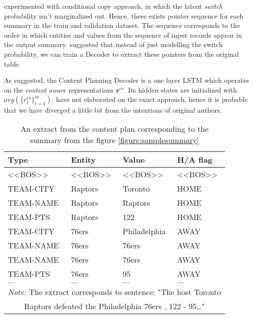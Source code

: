 \citet{wiseman2017} experimented with conditional copy approach, in which the latent \emph{switch} probability isn't marginalized out. Hence, there exists pointer sequence for each summary in the train and validation dataset. The sequence corresponds to the order in which entities and values from the sequence of input records appear in the output summary. \citet{puduppully2019datatotext} suggested that instead of just modelling the switch probability, we can train a Decoder to extract these pointers from the original table.

As suggested, the Content Planning Decoder is a one layer LSTM which operates on the \emph{context aware} representations $\boldsymbol{r}^{cs}$. Its hidden states are initialized with $avg(\{r_t^{cs}\}_{t=1}^m)$. \citet{puduppully2019datatotext} have not elaborated on the exact approach, hence it is probable that we have diverged a little bit from the intentions of original authors.

\begin{table}[h]
    \centering \small
    \begin{tabular}{llll}
        \toprule
        \textbf{Type} & \textbf{Entity} & \textbf{Value} & \textbf{H/A flag} \\                  
        \midrule
        \textless{}\textless{}BOS\textgreater{}\textgreater{} & \textless{}\textless{}BOS\textgreater{}\textgreater{} & \textless{}\textless{}BOS\textgreater{}\textgreater{} & \textless{}\textless{}BOS\textgreater{}\textgreater{} \\
        TEAM-CITY    & Raptors      & Toronto      & HOME                                                  \\
        TEAM-NAME    & Raptors      & Raptors      & HOME                                                  \\
        TEAM-PTS     & Raptors      & 122          & HOME                                                  \\
        TEAM-CITY    & 76ers        & Philadelphia & AWAY                                                  \\
        TEAM-NAME    & 76ers        & 76ers        & AWAY                                                  \\
        TEAM-NAME    & 76ers        & 76ers        & AWAY                                                  \\
        TEAM-PTS     & 76ers        & 95           & AWAY                                                  \\
        $\dots$      & $\dots$      & $\dots$      & $\dots$ \\                                        
        \bottomrule
        \multicolumn{4}{c}{\footnotesize \textit{Note:} The extract corresponds to sentence: "The host Toronto} \\
        \multicolumn{4}{c}{\footnotesize Raptors defeated the Philadelphia 76ers , 122 - 95\dots "}
    \end{tabular}
    \caption{An extract from the content plan corresponding to the summary from the figure \ref{figure:samplesummary}}
\end{table}


